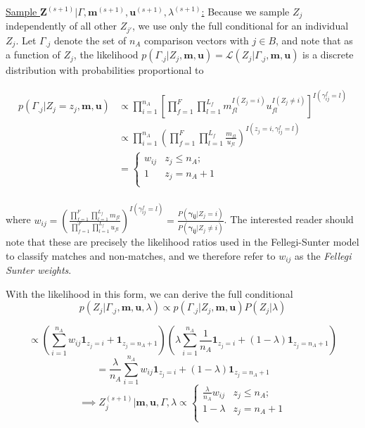 \documentclass[12pt,letterpaper]{article}
\newcommand{\1}[1]{\mathbb{I}\!\left[#1\right]} %
\begin{document}
\underline{Sample $\mathbf{Z}^{(s+1)}|\Gamma, \mathbf{m}^{(s+1)}, \mathbf{u}^{(s+1)}, \lambda^{(s+1)}$:}
Because we sample \(Z_j\) independently of all other \(Z_{j'}\), we use
only the full conditional for an individual \(Z_j\). Let \(\Gamma_{.j}\)
denote the set of \(n_A\) comparison vectors with \(j \in B\), and note
that as a function of \(Z_j\), the likelihood
\(p(\Gamma_{.j}|Z_j, \mathbf{m}, \mathbf{u}) = \mathcal{L}(Z_j|\Gamma_{.j}, \mathbf{m}, \mathbf{u})\)
is a discrete distribution with probabilities proportional to

\begin{align*}
	p(\Gamma_{.j}|Z_j = z_j, \mathbf{m}, \mathbf{u}) &\propto \prod_{i=1}^{n_A}\left[\prod_{f=1}^{F}\prod_{l=1}^{L_f} m_{fl}^{I(Z_j = i)}u_{fl}^{I(Z_j \neq i)}\right]^{I(\gamma_{ij}^f = l)}\\
	&\propto \prod_{i=1}^{n_A}\left(\prod_{f=1}^{F}\prod_{l=1}^{L_f} \frac{m_{fl}}{u_{fl}}\right)^{I(z_j = i, \gamma_{ij}^f = l)} \\
	&=
	\begin{cases} 
		w_{ij}  & z_j \leq n_A; \\
		1 &  z_j  = n_A + 1 \\
	\end{cases}\\
\end{align*}

where
\(w_{ij} = \left(\frac{\prod_{f=1}^{F}\prod_{l=1}^{L_f} m_{fl}}{\prod_{f=1}^{F}\prod_{l=1}^{L_f} u_{fl}}\right)^{I(\gamma_{ij}^f = l)} = \frac{P(\boldsymbol{\gamma_{ij}}|Z_j = i)}{P(\boldsymbol{\gamma_{ij}} |Z_j \neq i)}\).
The interested reader should note that these are precisely the
likelihood ratios used in the Fellegi-Sunter model to classify matches
and non-matches, and we therefore refer to \(w_{ij}\) as the
\emph{Fellegi Sunter weights}.

With the likelihood in this form, we can derive the full conditional
\[p(Z_j|\Gamma_{.j}, \mathbf{m} ,\mathbf{u}, \lambda) \propto p(\Gamma_{.j}| Z_j, \mathbf{m} ,\mathbf{u}) P(Z_j|\lambda)\]

\[\propto \left(\sum_{i=1}^{n_A}w_{ij}\mathbf{1}_{z_j = i} + \mathbf{1}_{z_j = n_A + 1}\right)\left(\lambda\sum_{i=1}^{n_A}\frac{1}{n_A}\mathbf{1}_{z_j = i} + (1-\lambda)\mathbf{1}_{z_j = n_A + 1}\right)\]
\[= \frac{\lambda}{n_A}\sum_{i=1}^{n_A}w_{ij}\mathbf{1}_{z_j = i} + (1-\lambda)\mathbf{1}_{z_j = n_A + 1} \]
\[ \implies Z_j^{(s+1)} | \mathbf{m}, \mathbf{u}, \Gamma, \lambda \propto
\begin{cases} 
	\frac{\lambda}{n_A}w_{ij}   & z_j \leq n_A; \\
	1-\lambda &  z_j  = n_A + 1 \\
\end{cases}\]
\end{document}

